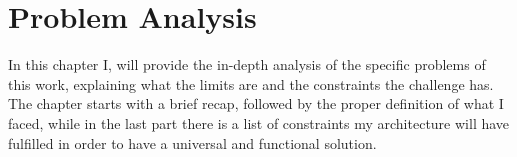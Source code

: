 %
%
\chapter{Problem Analysis}
%
\label{cap:probanalysis}
%
%

In this chapter I, will provide the in-depth analysis of the specific problems of this work, explaining what the limits are and the constraints the challenge has. The chapter starts with a brief recap, followed by the proper definition of what I faced, while in the last part there is a list of constraints my architecture will have fulfilled in order to have a universal and functional solution.
  

